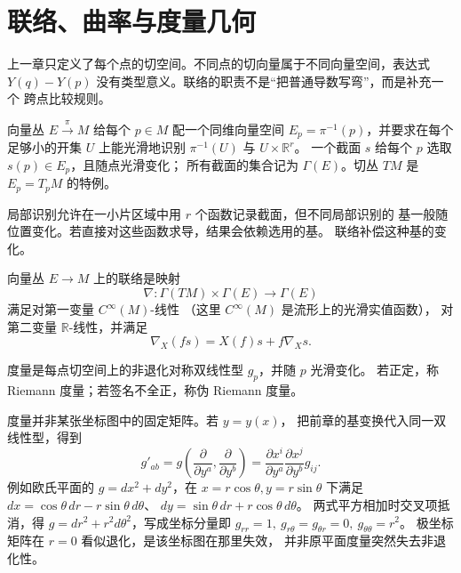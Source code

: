 \chapter{联络、曲率与度量几何}
\label{chap:math-connections}

上一章只定义了每个点的切空间。不同点的切向量属于不同向量空间，表达式
\(Y(q)-Y(p)\) 没有类型意义。联络的职责不是“把普通导数写弯”，而是补充一个
跨点比较规则。

\begin{definition}[向量丛与截面]
向量丛 \(E\xrightarrow{\pi}M\) 给每个 \(p\in M\) 配一个同维向量空间
\(E_p=\pi^{-1}(p)\)，并要求在每个足够小的开集 \(U\) 上能光滑地识别
\(\pi^{-1}(U)\) 与 \(U\times\mathbb R^r\)。
一个截面 \(s\) 给每个 \(p\) 选取 \(s(p)\in E_p\)，且随点光滑变化；
所有截面的集合记为 \(\Gamma(E)\)。切丛 \(TM\) 是 \(E_p=T_pM\)
的特例。
\end{definition}

局部识别允许在一小片区域中用 \(r\) 个函数记录截面，但不同局部识别的
基一般随位置变化。若直接对这些函数求导，结果会依赖选用的基。
联络补偿这种基的变化。

\begin{definition}[向量丛上的联络]
向量丛 \(E\to M\) 上的联络是映射
\[
\nabla:\Gamma(TM)\times\Gamma(E)\to\Gamma(E)
\]
满足对第一变量 \(C^\infty(M)\)-线性
（这里 \(C^\infty(M)\) 是流形上的光滑实值函数），
对第二变量 \(\mathbb R\)-线性，并满足
\[
\nabla_X(f s)=X(f)s+f\nabla_Xs.
\]
\end{definition}



\begin{definition}[伪 Riemann 度量]
度量是每点切空间上的非退化对称双线性型 \(g_p\)，并随 \(p\) 光滑变化。
若正定，称 Riemann 度量；若签名不全正，称伪 Riemann 度量。
\end{definition}

度量并非某张坐标图中的固定矩阵。若 \(y=y(x)\)，
把前章的基变换代入同一双线性型，得到
\[
g'_{ab}=g\!\left(\frac{\partial}{\partial y^a},
\frac{\partial}{\partial y^b}\right)
=\frac{\partial x^i}{\partial y^a}
\frac{\partial x^j}{\partial y^b}g_{ij}.
\]
例如欧氏平面的 \(g=dx^2+dy^2\)，在
\(x=r\cos\theta,y=r\sin\theta\) 下满足
\(dx=\cos\theta\,dr-r\sin\theta\,d\theta\)、
\(dy=\sin\theta\,dr+r\cos\theta\,d\theta\)。
两式平方相加时交叉项抵消，得
\(g=dr^2+r^2d\theta^2\)，写成坐标分量即
\(g_{rr}=1,\ g_{r\theta}=g_{\theta r}=0,\ g_{\theta\theta}=r^2\)。
极坐标矩阵在 \(r=0\) 看似退化，是该坐标图在那里失效，
并非原平面度量突然失去非退化性。

